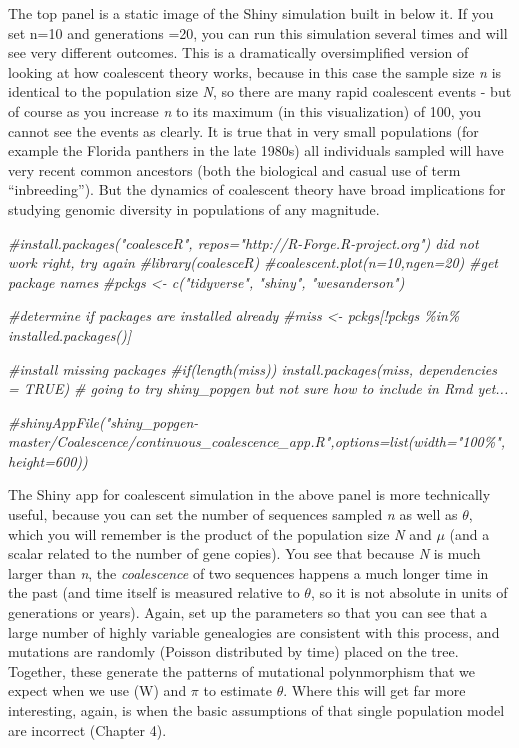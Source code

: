 \documentclass[
]{article}
\newenvironment{Shaded}{\begin{snugshade}}{\end{snugshade}}
\newcommand{\CommentTok}[1]{\textcolor[rgb]{0.56,0.35,0.01}{\textit{#1}}}
\begin{document}
The top panel is a static image of the Shiny simulation built in below
it. If you set n=10 and generations =20, you can run this simulation
several times and will see very different outcomes. This is a
dramatically oversimplified version of looking at how coalescent theory
works, because in this case the sample size \emph{n} is identical to the
population size \emph{N}, so there are many rapid coalescent events -
but of course as you increase \emph{n} to its maximum (in this
visualization) of 100, you cannot see the events as clearly. It is true
that in very small populations (for example the Florida panthers in the
late 1980s) all individuals sampled will have very recent common
ancestors (both the biological and casual use of term ``inbreeding'').
But the dynamics of coalescent theory have broad implications for
studying genomic diversity in populations of any magnitude.

\begin{Shaded}
\begin{Highlighting}[]
\CommentTok{\#install.packages("coalesceR", repos="http://R{-}Forge.R{-}project.org") did not work right, try again}
\CommentTok{\#library(coalesceR)}
\CommentTok{\#coalescent.plot(n=10,ngen=20)}
\CommentTok{\#get package names}
\CommentTok{\#pckgs \textless{}{-} c("tidyverse", "shiny", "wesanderson")}

\CommentTok{\#determine if packages are installed already}
\CommentTok{\#miss \textless{}{-} pckgs[!pckgs \%in\% installed.packages()]}

\CommentTok{\#install missing packages}
\CommentTok{\#if(length(miss)) install.packages(miss, dependencies = TRUE)}
\CommentTok{\# going to try shiny\_popgen but not sure how to include in Rmd yet...}

\CommentTok{\#shinyAppFile("shiny\_popgen{-}master/Coalescence/continuous\_coalescence\_app.R",options=list(width="100\%",height=600))}
\end{Highlighting}
\end{Shaded}

The Shiny app for coalescent simulation in the above panel is more
technically useful, because you can set the number of sequences sampled
\emph{n} as well as \(\theta\), which you will remember is the product
of the population size \emph{N} and \(\mu\) (and a scalar related to the
number of gene copies). You see that because \emph{N} is much larger
than \emph{n}, the \emph{coalescence} of two sequences happens a much
longer time in the past (and time itself is measured relative to
\(\theta\), so it is not absolute in units of generations or years).
Again, set up the parameters so that you can see that a large number of
highly variable genealogies are consistent with this process, and
mutations are randomly (Poisson distributed by time) placed on the tree.
Together, these generate the patterns of mutational polynmorphism that
we expect when we use (W) and \(\pi\) to estimate \(\theta\). Where this
will get far more interesting, again, is when the basic assumptions of
that single population model are incorrect (Chapter 4).
\end{document}
